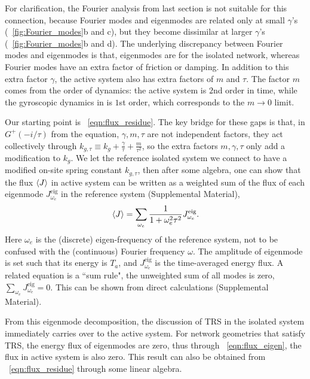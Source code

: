 \documentclass[
 preprint,
 preprintnumbers,
 amsmath,amssymb,
 aps,
 pre,
 longbibliography,
 10pt, twocolumn
]{revtex4-1}
\begin{document}
For clarification, the Fourier analysis from last section is not suitable for this connection, because Fourier modes and eigenmodes are related only at small $\gamma$'s (\figurename~\ref{fig:Fourier_modes}b and c), but they become dissimilar at larger $\gamma$'s (\figurename~\ref{fig:Fourier_modes}b and d).
The underlying discrepancy between Fourier modes and eigenmodes is that, eigenmodes are for the isolated network, whereas Fourier modes have an extra factor of friction or damping.
In addition to this extra factor $\gamma$, 
the active system also has extra factors of $m$ and $\tau$. The factor $m$ comes from the order of dynamics: the active system is $2$nd order in time, while the gyroscopic dynamics in \cite{Nash2015TopologicalMetamaterials} is $1$st order, which corresponds to the $m\rightarrow 0$ limit.

Our starting point is \eqnname~\eqref{eqn:flux_residue}. The key bridge for these gaps is that, in $G^+(-i/\tau)$ from the equation, $\gamma,m,\tau$ are not independent factors, they act collectively through $k_{g,\tau} \equiv k_g+\frac{\gamma}{\tau}+\frac{m}{\tau^2}$, so the extra factors $m,\gamma, \tau$ only add a modification to $k_g$. 
We let the reference isolated system we connect to have a modified on-site spring constant $k_{g,\tau}$, then after some algebra, one can show that the flux $\expval{J}$ in active system can be written as a weighted sum of the flux of each eigenmode $J^{\text{eig}}_{\omega_e}$ in the reference system (Supplemental Material),
\begin{equation} \label{eqn:flux_eigen}
    \expval{J} = \sum_{\omega_e} \frac{1}{1+\omega_e^2\tau^2} J^{\text{eig}}_{\omega_e}.
\end{equation}
Here $\omega_e$ is the (discrete) eigen-frequency of the reference system, not to be confused with the (continuous) Fourier frequency $\omega$. The amplitude of eigenmode is set such that its energy is $T_a$, and $J^{\text{eig}}_{\omega_e}$ is the time-averaged energy flux.
A related equation is a ``sum rule", the unweighted sum of all modes is zero, $\sum_{\omega_e} J^{\text{eig}}_{\omega_e} = 0$. This can be shown from direct calculations (Supplemental Material).

From this eigenmode decomposition, the discussion of TRS in the isolated system \cite{Nash2015TopologicalMetamaterials} immediately carries over to the active system. For network geometries that satisfy TRS, the energy flux of eigenmodes are zero, thus through \eqnname~\eqref{eqn:flux_eigen}, the flux in active system is also zero. This result can also be obtained from \eqnname~\eqref{eqn:flux_residue} through some linear algebra.
\end{document}
